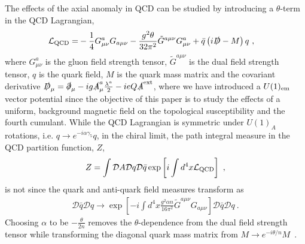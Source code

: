 \documentclass[12pt]{elsarticle}
\begin{document}
The effects of the axial anomaly in QCD can be studied by introducing a $\theta$-term in the QCD Lagrangian,
\begin{equation}
\begin{split}
\mathcal{L}_{\rm QCD}=&-\frac{1}{4}G_{\mu\nu}^{a}G_{a\mu\nu}-\frac{g^{2}\theta }{32\pi^{2}}\tilde{G}^{a\mu\nu}G_{\mu\nu}^{a}+\bar{q}\left (i\slashed{D}-M \right )q\ ,
\end{split}
\end{equation}
where $G^{a}_{\mu\nu}$ is the gluon field strength tensor, $\tilde{G}^{a\mu\nu}$ is the dual field strength tensor, $q$ is the quark field, $M$ is the quark mass matrix and the covariant derivative $\slashed{D}_{\mu}=\slashed{\partial}_{\mu}-ig\slashed{A}^{a}_{\mu}\tfrac{\lambda^{a}}{2}-ieQ\slashed{A}^{\rm ext}$, where we have introduced a $U(1)_{\rm em}$ vector potential since the objective of this paper is to study the effects of a uniform, background magnetic field on the topological susceptibility and the fourth cumulant. While the QCD Lagrangian is symmetric under $U(1)_{A}$ rotations, i.e. $q\rightarrow e^{-i\alpha\gamma_{5}}q$, in the chiral limit, the path integral measure in the QCD partition function, $Z$,
\begin{equation}
\begin{split}
Z=\int \mathcal{D}A\mathcal{D}q\mathcal{D}\bar{q}\exp\left [i\int d^{4}x\mathcal{L}_{\rm QCD} \right ]\ ,
\end{split}
\end{equation}
 is not since the quark and anti-quark field measures transform as~\cite{Fujikawa:1979ay} 
\begin{align}
\mathcal{D}\bar{q}\mathcal{D}q\rightarrow\exp\left [-i\int d^{4}x\frac{g^{2}\alpha n}{16\pi^{2}}\tilde{G}^{a\mu\nu}G_{a\mu\nu} \right ]\mathcal{D}\bar{q}\mathcal{D}q\ .
\end{align}
Choosing $\alpha$ to be $-\frac{\theta}{2n}$ removes the $\theta$-dependence from the dual field strength tensor while transforming the diagonal quark mass matrix from $M\rightarrow e^{-i\theta/n}M$~\cite{srednicki2007quantum}. 
\end{document}
